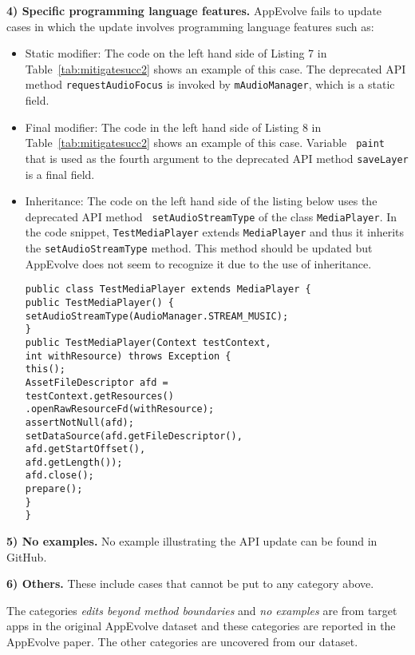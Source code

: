 \vspace{0.25\baselineskip}\noindent\textbf{4) Specific programming language features.} AppEvolve fails to update cases in which the update involves programming language features such as:
\begin{itemize}
\item Static modifier:  The code on the left hand side of Listing 7 in
Table~\ref{tab:mitigatesucc2} shows an example of this case.  The deprecated
API method {\tt requestAudioFocus} is invoked by {\tt mAudioManager}, which
is a static field.

\item Final modifier: The code in the left hand side of Listing 8 in
Table~\ref{tab:mitigatesucc2} shows an example of this case.  Variable {\tt
paint} that is used as the fourth argument to the deprecated API method
{\tt saveLayer} is a final field.

\item Inheritance: The code on the left hand side of the listing below uses the deprecated API method {\tt
	set\-Audio\-Stream\-Type} of the class {\tt MediaPlayer}. In the code snippet,
{\tt Test\-Media\-Player} extends {\tt MediaPlayer} and thus it inherits
the {\tt setAudioStreamType} method. This method should be updated but
AppEvolve does not seem to recognize it due to the use of inheritance.
\begin{lstlisting}[language=text]
public class TestMediaPlayer extends MediaPlayer {
public TestMediaPlayer() {
setAudioStreamType(AudioManager.STREAM_MUSIC);
}
public TestMediaPlayer(Context testContext,
int withResource) throws Exception {
this();
AssetFileDescriptor afd =
testContext.getResources()
.openRawResourceFd(withResource);
assertNotNull(afd);
setDataSource(afd.getFileDescriptor(),
afd.getStartOffset(),
afd.getLength());
afd.close();
prepare();
}
}
\end{lstlisting}

\end{itemize}

\vspace{0.25\baselineskip}\noindent\textbf{5) No examples.} No example
illustrating the API update can be found in GitHub.

\vspace{0.25\baselineskip}\noindent\textbf{6) Others.} These include cases that cannot be put to any category above.

\vspace{0.25\baselineskip}\noindent The categories {\em edits
beyond method boundaries} and {\em no examples} are from target apps in the
original AppEvolve dataset and these categories are reported in the
AppEvolve paper. The other categories are uncovered from our dataset.


